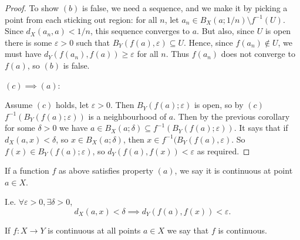 \documentclass[10pt, a4paper]{article}
\begin{document}
\begin{proposition}
\begin{proof}
        To show $(b)$ is false,
        we need a sequence,
        and we make it by picking a point from each sticking out region:
        for all $n$,
        let $a_n \in B_{X}(a; 1 / n) \setminus f ^ {-1}(U)$.
        Since $d_{X}(a_n, a) < 1 / n$,
        this sequence converges to $a$.
        But also,
        since $U$ is open there is some $\varepsilon > 0$ such that $B_{Y}(f(a), \varepsilon) \subseteq U$.
        Hence,
        since $f(a_n) \notin U$,
        we must have $d_{Y}(f(a_n), f(a)) \geq \varepsilon$ for all $n$.
        Thus $f(a_n)$ does not converge to $f(a)$,
        so $(b)$ is false.

        $(c) \implies (a)$:

        Assume $(c)$ holds,
        let $\varepsilon > 0$.
        Then $B_{Y}(f(a); \varepsilon)$ is open,
        so by $(c)$ $f ^ {-1}(B_{Y}(f(a); \varepsilon))$ is a neighbourhood of $a$.
        Then by the previous corollary for some $\delta > 0$ we have $a \in B_{X}(a; \delta) \subseteq f ^ {-1}(B_{Y}(f(a); \varepsilon))$.
        It says that if $d_{X}(a, x) < \delta$,
        so $x \in B_{X}(a; \delta)$,
        then $x \in f ^ {-1}(B_{Y}(f(a), \varepsilon)$.
        So $f(x) \in B_{Y}(f(a); \varepsilon)$,
        so $d_{Y}(f(a), f(x)) < \varepsilon$ as required.
    \end{proof}
\end{proposition}

\begin{definition}
    If a function $f$ as above satisfies property $(a)$,
    we say it is continuous at point $a \in X$.

    I.e.
    $\forall \varepsilon > 0, \exists \delta > 0$,
    \[
    d_{X}(a, x) < \delta \implies d_{Y}(f(a), f(x)) < \varepsilon.
    \]
\end{definition}

\begin{definition}
    If $f : X \to Y$ is continuous at all points $a \in X$ we say that $f$ is continuous.
\end{definition}
\end{document}
